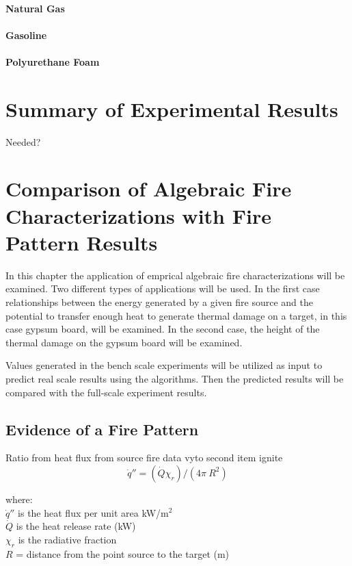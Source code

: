 \documentclass[twoside]{uocthesis}
\begin{document}
\subsubsection{Natural Gas}
\subsubsection{Gasoline}
\subsubsection{Polyurethane Foam}

\chapter{Summary of Experimental Results}

Needed?

\chapter{Comparison of Algebraic Fire Characterizations with Fire Pattern Results}

In this chapter the application of emprical algebraic fire characterizations will be examined. Two different types of applications will be used.  In the first case relationships between the energy generated by a given fire source and the potential to transfer enough heat to generate thermal damage on a target, in this case gypsum board, will be examined.  In the second case, the height of the thermal damage on the gypsum board will be examined.  

Values generated in the bench scale experiments will be utilized as input to predict real scale results using the algorithms.  Then the predicted results will be compared with the full-scale experiment results.  




\section{Evidence of a Fire Pattern}

Ratio from heat flux from source fire data
vyto second item ignite
\begin{equation} \label{eq:second_item}
\dot{q}'' = (\dot{Q} \chi_r)/(4 \pi\ R^2)
\end{equation}

\begin{tabbing}
where: \=  \\

\> $\dot{q}''$ is the heat flux per unit area kW/m$^2$\\
\> $\dot{Q}$ is the heat release rate (kW) \\ 
\> $\chi_r$ is the radiative fraction \\
\> $R$ = distance from the point source to the target (m) \\
\end{tabbing}
\end{document}
